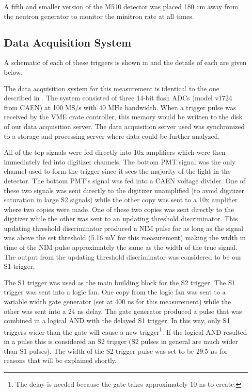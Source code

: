 A fifth and smaller version of the M510 detector was placed 180 cm away from the neutron generator to monitor the minitron rate at all times.



\subsection{Data Acquisition System}
\label{sec:nerix_daq_trigger}

A schematic of each of these triggers is shown in  and the details of each are given below.

The data acquisition system for this measurement is identical to the one described in .  The system consisted of three 14-bit flash ADCs (model v1724 from CAEN) at 100 MS/s with 40 MHz bandwidth.  When a trigger pulse was received by the VME crate controller, this memory would be written to the disk of our data acquisition server.  The data acquisition server used was synchronized to a storage and processing server where data could be further analyzed.

All of the top signals were fed directly into 10x amplifiers which were then immediately fed into digitizer channels.  The bottom PMT signal was the only channel used to form the trigger since it sees the majority of the light in the detector.  The bottom PMT's signal was fed into a CAEN voltage divider.  One of these two signals was sent directly to the digitizer unamplified (to avoid digitizer saturation in large S2 signals) while the other copy was sent to a 10x amplifier where two copies were made.  One of these two copies was sent directly to the digitizer while the other was sent to an updating threshold discriminator.  This updating threshold discriminator produced a NIM pulse for as long as the signal was above the set threshold (5.16 mV for this measurement) making the width in time of the NIM pulse approximately the same as the width of the true signal.  The output from the updating threshold discriminator was considered to be our S1 trigger.  

The S1 trigger was used as the main building block for the S2 trigger.  The S1 trigger was sent into a logic fan.  One copy from the logic fan was sent to a variable width gate generator (set at 400 ns for this measurement) while the other was sent into a 24 ns delay.  The gate generator produced a \nimbar{} pulse that was combined in a logical AND with the delayed S1 trigger.  In this way, only S1 triggers wider than the gate will cause a new trigger\footnote{The delay is needed because the gate takes approximately 10 ns to create.}.  If the logical AND resulted in a pulse this is considered an S2 trigger (S2 pulses in general are much wider than S1 pulses).  The width of the S2 trigger pulse was set to be 29.5 $\mu$s for reasons that will be explained shortly.

